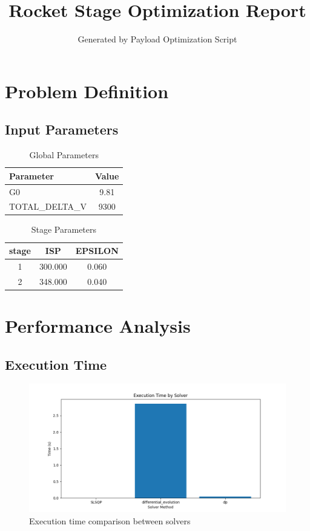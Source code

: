 \documentclass{article}
\begin{document}
\title{Rocket Stage Optimization Report}
\author{Generated by Payload Optimization Script}
\maketitle
\section{Problem Definition}
\subsection{Input Parameters}
\begin{table}[H]
\centering
\caption{Global Parameters}
\begin{tabular}{lc}
\toprule
\midrule
Parameter & Value \\
\midrule
G0 & 9.81 \\
TOTAL\_DELTA\_V & 9300 \\
\midrule
\bottomrule
\end{tabular}

\end{table}
\begin{table}[H]
\centering
\caption{Stage Parameters}
\begin{tabular}{ccc}
\toprule
\midrule
stage & ISP & EPSILON \\
\midrule
1 & 300.000 & 0.060 \\
2 & 348.000 & 0.040 \\
\midrule
\bottomrule
\end{tabular}

\end{table}
\section{Performance Analysis}
\subsection{Execution Time}
\begin{figure}[H]
\centering
\includegraphics[width=\textwidth]{execution_time.png}
\caption{Execution time comparison between solvers}
\end{figure}
\end{document}
